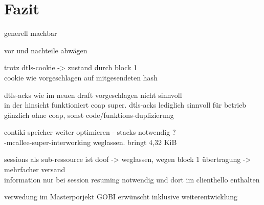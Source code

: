 \chapter{Fazit}

generell machbar

vor und nachteile abwägen

trotz dtls-cookie -> zustand durch block 1\\
cookie wie vorgeschlagen auf mitgesendeten hash

dtls-acks wie im neuen draft \cite{draftpractical} vorgeschlagen nicht sinnvoll\\
in der hinsicht funktioniert coap super. dtls-acks lediglich sinnvoll für betrieb gänzlich ohne coap, sonst code/funktions-duplizierung

contiki speicher weiter optimieren - stacks notwendig ?\\
-mcallee-super-interworking weglassen. bringt 4,32 KiB

sessions als sub-ressource ist doof -> weglassen, wegen block 1 übertragung -> mehrfacher versand\\
information nur bei session resuming notwendig und dort im clienthello enthalten

verwedung im Masterporjekt GOBI erwünscht inklusive weiterentwicklung